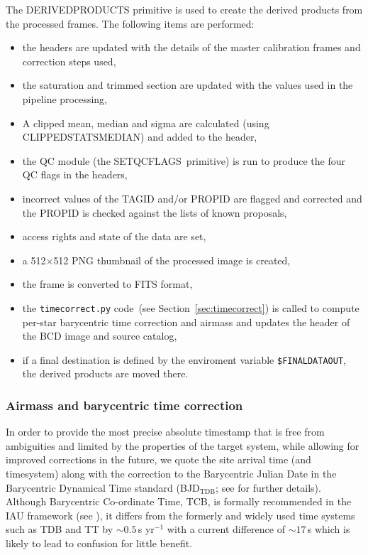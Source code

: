 \documentclass[twoside,11pt]{article}
\renewcommand{\_}{\texttt{\symbol{95}}}
\newcommand{\task}[1]{\textsf{#1}}
\newcommand{\Ast}{\texttt{timecorrect.py} code}
\newcommand{\rmn}[1] {\mathrm{#1}}
\begin{document}
The \task{\_DERIVED\_PRODUCTS\_} primitive is used to create the derived products from the processed frames. The
following items are performed:
\begin{itemize}
\item  the headers are updated with the details of the master calibration frames
   and correction steps used,
\item  the saturation and trimmed section are updated with the values used in
   the pipeline processing,
\item  A clipped mean, median and sigma are calculated (using
\task{\_CLIPPED\_STATS\_MEDIAN\_}) and added to the header,
\item  the QC module (the \task{\_SET\_QC\_FLAGS\_}\ primitive) is run to produce the four QC flags in the headers,
\item  incorrect values of the TAGID and/or PROPID are flagged and corrected
   and the PROPID is checked against the lists of known proposals,
\item  access rights and state of the data are set,
\item  a 512$\times$512 PNG thumbnail of the processed image is created,
\item  the frame is converted to FITS format,
\item  the \Ast\ (see Section~\ref{sec:timecorrect}) is called to compute per-star barycentric time
   correction and airmass and updates the header of the BCD image and
   source catalog,
\item  if a final destination is defined by the enviroment variable
   \texttt{\$FINAL\_DATA\_OUT}, the derived products are moved there.
\end{itemize}

\subsubsection{Airmass and barycentric time correction}
\protect\label{sec:timecorrect}


In order to provide the most precise absolute timestamp that is free from
ambiguities and limited by the properties of the target system, while allowing
for improved corrections in the future, we quote the site arrival time (and
timesystem) along with the correction to the Barycentric Julian Date in the
Barycentric Dynamical Time standard (BJD$_\rmn{TDB}$; see \cite{eastman2010} for
further details). Although Barycentric Co-ordinate Time, TCB, is formally
recommended in the IAU framework (see \cite{iers2010}), it differs from the
formerly and widely used time systems such as TDB and TT by
$\sim0.5$\,s yr$^{-1}$ with a current difference of $\sim17$\,s which is likely to
lead to confusion for little benefit.
\end{document}
